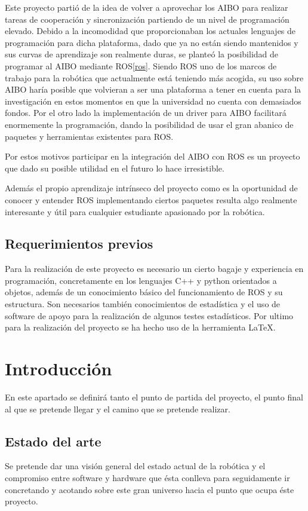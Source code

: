 \documentclass[12pt,a4paper,final,twoside]{article}
\begin{document}
Este proyecto partió de la idea de volver a aprovechar los AIBO para realizar tareas de cooperación y sincronización partiendo de un nivel de programación elevado. Debido a la incomodidad que proporcionaban los actuales lenguajes de programación para dicha plataforma, dado que ya no están siendo mantenidos y sus curvas de aprendizaje son realmente duras,   se planteó la posibilidad de programar al AIBO mediante ROS\ref{ros}.
Siendo ROS uno de los marcos de trabajo para la robótica que actualmente está teniendo más acogida, su uso sobre AIBO haría posible que volvieran a ser una plataforma a tener en cuenta para la investigación en estos momentos en que la universidad no cuenta con demasiados fondos. Por el otro lado la implementación de un driver para AIBO facilitará enormemente la programación, dando la posibilidad de usar el gran abanico de paquetes y herramientas existentes para ROS.

Por estos motivos participar en la integración del AIBO con ROS es un proyecto que dado su posible utilidad en el futuro lo hace irresistible.

Además el propio aprendizaje intrínseco del proyecto como es la oportunidad de conocer y entender ROS implementando ciertos paquetes resulta algo realmente interesante y útil para cualquier estudiante apasionado por la robótica.


\subsection{Requerimientos previos}
Para la realización de este proyecto es necesario un cierto bagaje y experiencia en programación, concretamente en los lenguajes C++ y python orientados a objetos, además de un conocimiento básico del funcionamiento de ROS y su estructura.
Son necesarios también conocimientos de estadística y el uso de software de apoyo para la realización de algunos testes estadísticos.
Por ultimo para la realización del proyecto se ha hecho uso de la herramienta \LaTeX. 
\newpage
\clearpage

\section{Introducción}
En este apartado se definirá tanto el punto de partida del proyecto, el punto final al que se pretende llegar y el camino que se pretende realizar. 
 
\subsection{Estado del arte}\label{estatdelart}
Se pretende dar una visión general del estado actual de la robótica y el compromiso entre software y hardware que ésta conlleva para seguidamente ir concretando y acotando sobre este gran universo hacia el punto que ocupa éste proyecto. 
\end{document}

